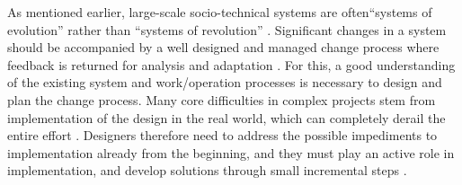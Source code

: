 As mentioned earlier, large-scale socio-technical systems are often``systems of evolution'' rather than ``systems of revolution'' \cite{Baxter2011,Norman2015}. Significant changes in a system should be accompanied by a well designed and managed change process where feedback is returned for analysis and adaptation \cite{Baxter2011}. For this, a good understanding of the existing system and work/operation processes is necessary to design and plan the change process. Many core difficulties in complex projects stem from implementation of the design in the real world, which can completely derail the entire effort \cite{Norman2015}. Designers therefore need to address the possible impediments to implementation already from the beginning, and they must play an active role in implementation, and develop solutions through small incremental steps \cite{Norman2015}.

